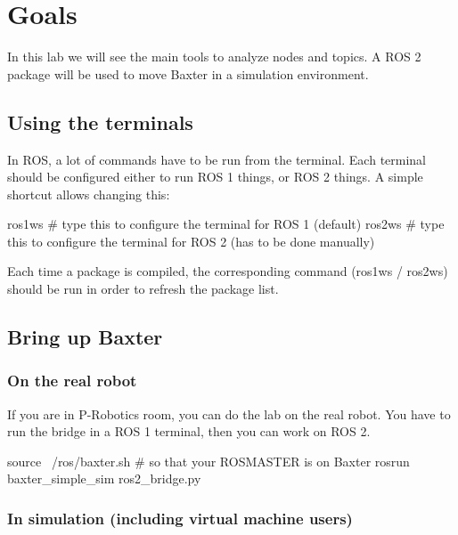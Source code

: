 \documentclass{ecnreport}
\author{O. Kermorgant}
\begin{document}


\section{Goals}

In this lab we will see the main tools to analyze nodes and topics. A ROS 2 package will be used to move Baxter in a simulation environment.

\subsection{Using the terminals}

In ROS, a lot of commands have to be run from the terminal. Each terminal should be configured either to run ROS 1 things, or ROS 2 things.
A simple shortcut allows changing this:
\begin{bashcodelarge}
ros1ws  # type this to configure the terminal for ROS 1 (default)
ros2ws  # type this to configure the terminal for ROS 2 (has to be done manually)
\end{bashcodelarge}

Each time a package is compiled, the corresponding command (ros1ws / ros2ws) should be run in order to refresh the package list.

\subsection{Bring up Baxter}

\subsubsection{On the real robot}

If you are in P-Robotics room, you can do the lab on the real robot. You have to run the bridge in a ROS 1 terminal, then you can work on ROS 2.

\begin{bashcodelarge}
 source ~/ros/baxter.sh # so that your ROSMASTER is on Baxter
 rosrun baxter_simple_sim ros2_bridge.py
\end{bashcodelarge}

\subsubsection{In simulation (including virtual machine users)}
\end{document}
